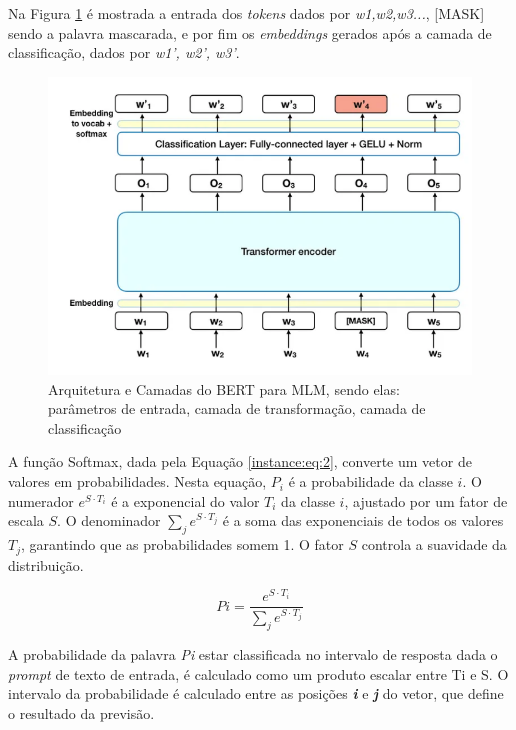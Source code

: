 Na Figura \ref{fig:bert2} é mostrada a entrada dos \textit{tokens} dados por \textit{w1,w2,w3...}, [MASK] sendo a palavra mascarada, e por fim os \textit{embeddings} gerados após a camada de classificação, dados por \textit{w1', w2', w3'}.
\begin{figure}[H]
    \centering
    \includegraphics[width=\linewidth]{img/BERT/bert2.png}
    \caption{Arquitetura e Camadas do BERT para MLM, sendo elas: parâmetros de entrada, camada de transformação, camada de classificação}
    \label{fig:bert2}
\end{figure}

A função Softmax, dada pela Equação \ref{instance:eq:2}, converte um vetor de valores em probabilidades. Nesta equação, \({P_i}\) é a probabilidade da classe \(i\). O numerador \(e^{S \cdot T_i}\) é a exponencial do valor \(T_i\) da classe \(i\), ajustado por um fator de escala \(S\). O denominador \(\sum_{j} e^{S \cdot T_j}\) é a soma das exponenciais de todos os valores \(T_j\), garantindo que as probabilidades somem 1. O fator \(S\) controla a suavidade da distribuição.

\begin{equation}
    \label{instance:eq:2}
    {Pi} = \frac{e^{S \cdot T_i}}{\sum_{j} e^{S \cdot T_j}}
\end{equation}

A probabilidade da palavra \textit{Pi} estar classificada no intervalo de resposta dada o \textit{prompt} de texto de entrada, é calculado como um produto escalar entre Ti e S. O intervalo da probabilidade é calculado entre as posições \textit{\textbf{i}} e \textit{\textbf{j}} do vetor, que define o resultado da previsão.

